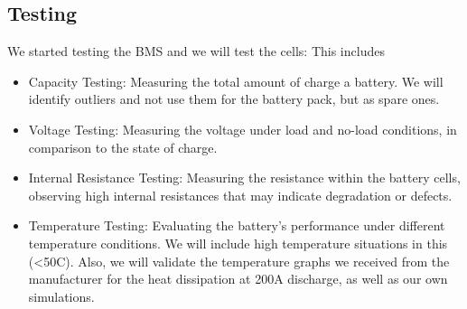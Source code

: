 \subsection{Testing}
We started testing the BMS and we will test the cells: This includes 
\begin{itemize}
    \item Capacity Testing: Measuring the total amount of charge a battery. We will identify outliers and not use them for the battery pack, but as spare ones.
    \item Voltage Testing: Measuring the voltage under load and no-load conditions, in comparison to the state of charge.
    \item Internal Resistance Testing: 
    Measuring the resistance within the battery cells, observing high internal resistances that may indicate degradation or defects.
    \item Temperature Testing: Evaluating the battery's performance under different temperature conditions. We will include high temperature situations in this (<50C). Also, we will validate the temperature graphs we received from the manufacturer for the heat dissipation at 200A discharge, as well as our own simulations.
\end{itemize}


